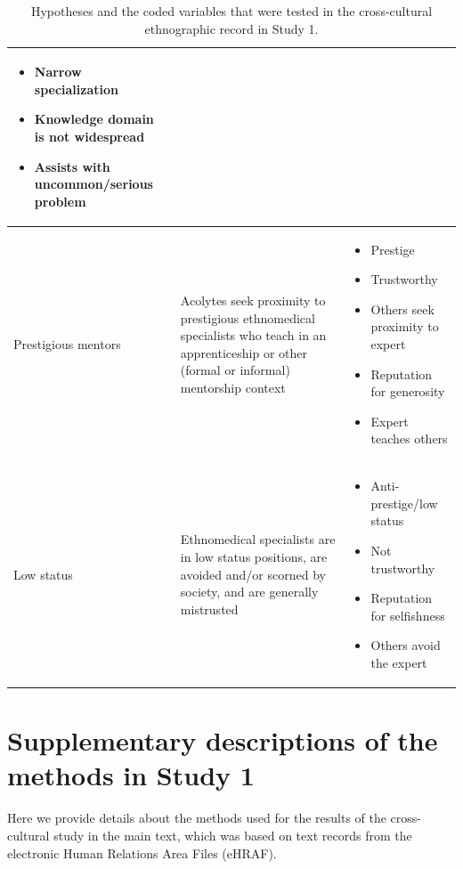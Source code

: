 \documentclass[
]{article}
\begin{document}
\begin{table}[!ht]
\begin{tabularx}{\textwidth}{@{}lXX@{}}
\begin{itemize}
          \item Narrow specialization
          \item Knowledge domain is not widespread
          \item Assists with uncommon/serious problem
          \end{itemize}  \\
        \hline
        Prestigious mentors    & 
        Acolytes seek proximity to prestigious ethnomedical specialists who teach in an apprenticeship or other (formal or informal) mentorship context  & 
        \begin{itemize}
          \item Prestige
          \item Trustworthy
          \item Others seek proximity to expert
          \item Reputation for generosity
          \item Expert teaches others
          \end{itemize}  \\
        \hline
        Low status    & 
        Ethnomedical specialists are in low status positions, are avoided and/or scorned by society, and are generally mistrusted  & 
        \begin{itemize}
          \item Anti-prestige/low status
          \item Not trustworthy
          \item Reputation for selfishness
          \item Others avoid the expert
          \end{itemize}  \\
        \hline
        \bottomrule
    \end{tabularx}
    \caption{\label{tab:vartable}Hypotheses and the coded variables that were tested in the cross-cultural ethnographic record in Study 1.}
\end{table}

\hypertarget{supplementary-descriptions-of-the-methods-in-study-1}{%
\section{Supplementary descriptions of the methods in Study 1}\label{supplementary-descriptions-of-the-methods-in-study-1}}

Here we provide details about the methods used for the results of the cross-cultural study in the main text, which was based on text records from the electronic Human Relations Area Files (eHRAF).
\end{document}
